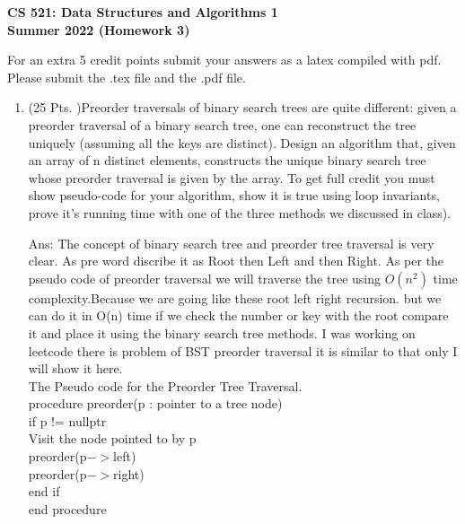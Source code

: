 \documentclass[margin=3mm]{article}
\begin{document}
\begin{center}
\begin{LARGE}{\bf CS 521: Data Structures and Algorithms 1\\Summer
      2022 (Homework 3)} \end{LARGE}
\end{center}

For an extra 5 credit points submit your answers as a latex compiled with pdf. Please submit the .tex file and the .pdf file.


\begin{enumerate}
\item (25 Pts. )Preorder traversals of binary search trees are quite different: given a preorder traversal of a binary search tree, one can reconstruct the tree uniquely (assuming all the keys are distinct). Design an algorithm that, given an array of n distinct elements, constructs the unique binary search tree whose preorder traversal is given by the array. To get full credit you must show pseudo-code for your algorithm, show it is true using loop invariants, prove it’s running time with one of the three methods we discussed in class).

\item[Ans: ]  The concept of binary search tree and preorder tree traversal is very clear. As pre word discribe it as Root then Left and then Right. As per the pseudo code of preorder traversal we will traverse the tree using $O(n^2)$ time complexity.Because we are going like these root left right recursion. but we can do it in O(n) time if we check the number or key with the root compare it and place it using the binary search tree methods. I was working on leetcode there is problem of BST preorder traversal it is similar to that only I will show it here.\\
The Pseudo code for the Preorder Tree Traversal.\\
procedure preorder(p : pointer to a tree node)\\
    if p != nullptr\\
        Visit the node pointed to by p\\
        preorder(p$->$left)\\
        preorder(p$->$right)\\
    end if\\
end procedure\\


\end{enumerate}
\end{document}
